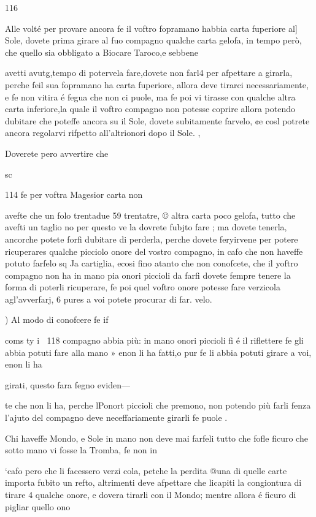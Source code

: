 \documentclass[12pt,a6paper]{article}
\begin{document}
116

Alle volté per provare ancora fe il voftro fopramano
habbia carta fuperiore al] Sole,
dovete prima girare al fuo compagno qualche carta gelofa, in
tempo però, che quello sia obbligato
a Biocare Taroco,e sebbene

avetti avutg,tempo di potervela
fare,dovete non farl4 per afpettare a girarla, perche feil sua
fopramano ha carta fuperiore,
allora deve tirarci necessariamente, e fe non vitira é fegua
che non ci puole, ma fe poi vi
tirasse con qualche altra carta
inferiore,la quale il voftro compagno non potesse coprire allora potendo dubitare che poteffe
ancora su il Sole, dovete subitamente farvelo, ¢e cosl potrete
ancora regolarvi rifpetto all’altrionori dopo il Sole. ,

Doverete pero avvertire che

sc
 

114
fe per voftra Magesior carta non

avefte che un folo trentadue 59
trentatre, © altra carta poco
gelofa, tutto che avefti un taglio
no per questo ve la dovrete fubjto fare ; ma dovete tenerla, ancorche potete forfi dubitare di
perderla, perche dovete feryirvene per potere ricuperares
qualche picciolo onore del vostro compagno, in cafo che non
haveffe potuto farfelo sq Ja cartiglia, ecosi fino atanto che
non conofcete, che il yoftro
compagno non ha in mano pia
onori piccioli da farfi dovete
fempre tenere la forma di poterli ricuperare, fe poi quel
voftro onore potesse fare verzicola agl’avverfarj, 6 pures
a voi potete procurar di far.
velo.

) Al modo di conofcere fe if

coms
ty i
118
compagno abbia più: in mano
onori piccioli fi é il riflettere fe
gli abbia potuti fare alla mano »
enon li ha fatti,o pur fe li abbia
potuti girare a voi, enon li ha

girati, questo fara fegno eviden—

te che non li ha, perche lPonort
piccioli che premono, non potendo più farli fenza l’ajuto del
compagno deve neceffariamente girarli fe puole .

Chi haveffe Mondo, e Sole in
mano non deve mai farfeli tutto
che fofle ficuro che sotto mano
vi fosse la Tromba, fe non in

‘cafo pero che li facessero verzi
cola, petche la perdita @una di
quelle carte importa fubito un
refto, altrimenti deve afpettare
che licapiti la congiontura di
tirare 4 qualche onore, e dovera tirarli con il Mondo; mentre
allora é ficuro di pigliar quello
ono  
\end{document}
